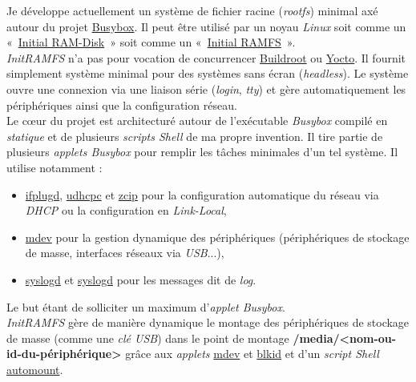 \documentclass[a4paper]{article}
\begin{document}
Je développe actuellement un système de fichier racine (\textit{rootfs}) minimal axé autour du projet \href{http://www.busybox.net/}{Busybox}. Il peut être utilisé par un noyau \textit{Linux} soit comme un «~\href{https://www.kernel.org/doc/Documentation/initrd.txt}{Initial RAM-Disk}~» soit comme un «~\href{https://www.kernel.org/doc/Documentation/filesystems/ramfs-rootfs-initramfs.txt}{Initial RAMFS}~».\\

\textit{InitRAMFS} n'a pas pour vocation de concurrencer \href{http://buildroot.org/}{Buildroot} ou \href{https://www.yoctoproject.org/}{Yocto}. Il fournit simplement système minimal pour des systèmes sans écran (\textit{headless}). Le système ouvre une connexion via une liaison série (\textit{login}, \textit{tty}) et gère automatiquement les périphériques ainsi que la configuration réseau.\\

Le c\oe{}ur du projet est architecturé autour de l'exécutable \textit{Busybox} compilé en \textit{statique} et de plusieurs \textit{scripts Shell} de ma propre invention. Il tire partie de plusieurs \textit{applets Busybox} pour remplir les tâches minimales d'un tel système. Il utilise notamment :
\begin{itemize}
\item \href{http://www.busybox.net/downloads/BusyBox.html#ifplugd}{ifplugd}, \href{http://www.busybox.net/downloads/BusyBox.html#udhcpc}{udhcpc} et \href{http://www.busybox.net/downloads/BusyBox.html#zcip}{zcip} pour la configuration automatique du réseau via \textit{DHCP} ou la configuration en \textit{Link-Local},
\item \href{http://www.busybox.net/downloads/BusyBox.html#mdev}{mdev} pour la gestion dynamique des périphériques (périphériques de stockage de masse, interfaces réseaux via \textit{USB}...),
\item \href{http://www.busybox.net/downloads/BusyBox.html#syslogd}{syslogd} et \href{http://www.busybox.net/downloads/BusyBox.html#klogd}{syslogd} pour les messages dit de \textit{log}.
\end{itemize}

Le but étant de solliciter un maximum d'\textit{applet Busybox}.\\

\textit{InitRAMFS} gère de manière dynamique le montage des périphériques de stockage de masse (comme une \textit{clé USB}) dans le point de montage \textbf{/media/<nom-ou-id-du-périphérique>} grâce aux \textit{applets} \href{http://www.busybox.net/downloads/BusyBox.html#mdev}{mdev} et \href{http://www.busybox.net/downloads/BusyBox.html#blkid}{blkid} et d'un \textit{script Shell} \href{https://github.com/gazoo74/initramfs/blob/old-fixes-and-dev-need-study/packages-initramfs/mdev/usr/sbin/automount}{automount}.\\
\end{document}
